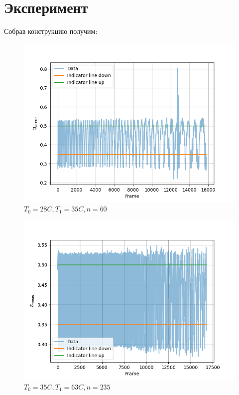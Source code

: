 \section{Эксперимент}

Собрав конструкцию получим:

\begin{figure}[h]
    \centering
    \includegraphics[trim={0 0 0 0},clip,width=\textwidth]{Ex_3/3_3.png}
    \caption{$T_0 = 28C, T_1 = 35C, n = 60$}
    \label{3_1}
\end{figure}

\begin{figure}[h]
    \centering
    \includegraphics[trim={0 0 0 0},clip,width=\textwidth]{Ex_3/3_2.png}
    \caption{$T_0 = 35C, T_1 = 63C, n = 235$}
    \label{3_2}
\end{figure}

